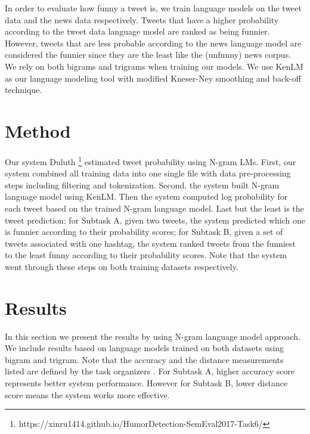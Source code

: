 \documentclass[11pt,a4paper]{article}
\begin{document}
In order to evaluate how funny a tweet is, we train language models on the tweet data and the news data respectively. Tweets that have a higher probability according to the tweet data language model are ranked as being funnier. However, tweets that are less probable according to the news language model are considered the funnier since they are the least like the (unfunny) news corpus. We rely on both bigrams and trigrams when training our models. We use KenLM \cite{Heafield-estimate} as our language modeling tool with modified Kneser-Ney smoothing and back-off technique.

\section{Method}
Our system Duluth \footnote{https://xinru1414.github.io/HumorDetection-SemEval2017-Task6/} estimated tweet probability using N-gram LMs. First, our system combined all training data into one single file with data pre-processing steps including filtering and tokenization. Second, the system built N-gram language model using KenLM. Then the system computed log probability for each tweet based on the trained N-gram language model. Last but the least is the tweet prediction: for Subtask A, given two tweets, the system predicted which one is funnier according to their probability scores; for Subtask B, given a set of tweets associated with one hashtag, the system ranked tweets from the funniest to the least funny according to their probability scores. 
Note that the system went through these steps on both training datasets respectively.

\section{Results}
In this section we present the results by using N-gram language model approach. We include results based on language models trained on both datasets using bigram and trigram. Note that the accuracy and the distance measurements listed are defined by the task organizers 
\cite{PotashRR17}. For Subtask A, higher accuracy score represents better system performance. However for Subtask B, lower distance score means the system works more effective.
\end{document}
